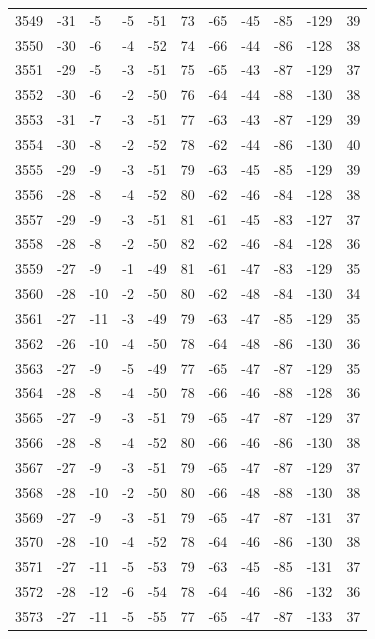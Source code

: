 \begin{table}[H]
\begin{tabular}{lllllllllll}
3549 & -31 & -5 & -5 & -51 & 73 & -65 & -45 & -85 & -129 & 39 \\
3550 & -30 & -6 & -4 & -52 & 74 & -66 & -44 & -86 & -128 & 38 \\
3551 & -29 & -5 & -3 & -51 & 75 & -65 & -43 & -87 & -129 & 37 \\
3552 & -30 & -6 & -2 & -50 & 76 & -64 & -44 & -88 & -130 & 38 \\
3553 & -31 & -7 & -3 & -51 & 77 & -63 & -43 & -87 & -129 & 39 \\
3554 & -30 & -8 & -2 & -52 & 78 & -62 & -44 & -86 & -130 & 40 \\
3555 & -29 & -9 & -3 & -51 & 79 & -63 & -45 & -85 & -129 & 39 \\
3556 & -28 & -8 & -4 & -52 & 80 & -62 & -46 & -84 & -128 & 38 \\
3557 & -29 & -9 & -3 & -51 & 81 & -61 & -45 & -83 & -127 & 37 \\
3558 & -28 & -8 & -2 & -50 & 82 & -62 & -46 & -84 & -128 & 36 \\
3559 & -27 & -9 & -1 & -49 & 81 & -61 & -47 & -83 & -129 & 35 \\
3560 & -28 & -10 & -2 & -50 & 80 & -62 & -48 & -84 & -130 & 34 \\
3561 & -27 & -11 & -3 & -49 & 79 & -63 & -47 & -85 & -129 & 35 \\
3562 & -26 & -10 & -4 & -50 & 78 & -64 & -48 & -86 & -130 & 36 \\
3563 & -27 & -9 & -5 & -49 & 77 & -65 & -47 & -87 & -129 & 35 \\
3564 & -28 & -8 & -4 & -50 & 78 & -66 & -46 & -88 & -128 & 36 \\
3565 & -27 & -9 & -3 & -51 & 79 & -65 & -47 & -87 & -129 & 37 \\
3566 & -28 & -8 & -4 & -52 & 80 & -66 & -46 & -86 & -130 & 38 \\
3567 & -27 & -9 & -3 & -51 & 79 & -65 & -47 & -87 & -129 & 37 \\
3568 & -28 & -10 & -2 & -50 & 80 & -66 & -48 & -88 & -130 & 38 \\
3569 & -27 & -9 & -3 & -51 & 79 & -65 & -47 & -87 & -131 & 37 \\
3570 & -28 & -10 & -4 & -52 & 78 & -64 & -46 & -86 & -130 & 38 \\
3571 & -27 & -11 & -5 & -53 & 79 & -63 & -45 & -85 & -131 & 37 \\
3572 & -28 & -12 & -6 & -54 & 78 & -64 & -46 & -86 & -132 & 36 \\
3573 & -27 & -11 & -5 & -55 & 77 & -65 & -47 & -87 & -133 & 37 \\

\end{tabular}
\end{table}
